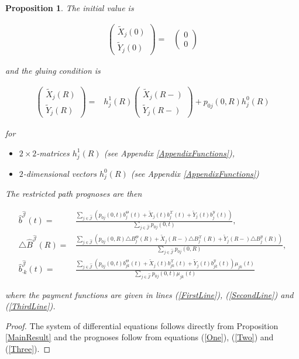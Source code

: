 \documentclass{article}
\newcommand{\1}[1]{\mathbbm{1}_{\left\lbrace #1 \right\rbrace}}
\theoremstyle{break}
\newtheorem{proposition}[definition]{Proposition}%
\theoremstyle{remark}
\numberwithin{equation}{section}
\begin{document}
\begin{proposition}
The initial value is

\begin{align*}
\begin{pmatrix}\tilde{X}_j(0) \\ \tilde{Y}_j(0)\end{pmatrix} =& \begin{pmatrix}0 \\ 0\end{pmatrix}
\end{align*}

and the gluing condition is

\begin{align*}
\begin{pmatrix}\tilde{X}_j(R) \\ \tilde{Y}_j(R)\end{pmatrix} =& h_j^1(R) \begin{pmatrix}\tilde{X}_j(R-) \\ \tilde{Y}_j(R-)\end{pmatrix} + p_{0j}(0,R) h_j^0(R)
\end{align*}

for

\begin{itemize}
	\item $2 \times 2$-matrices $h_j^1(R)$ (see Appendix \ref{AppendixFunctions}),
	\item $2$-dimensional vectors $h_j^0(R)$ (see Appendix \ref{AppendixFunctions})
\end{itemize}

The restricted path prognoses are then

\begin{align*}
	\hat{b}^{\hat{\mathcal{J}}}(t) =& \frac{\sum_{j \in \hat{\mathcal{J}}} \left( p_{0j}(0,t) b_j^\Theta(t) + \tilde{X}_j(t) b_j^\mathcal{X}(t) + \tilde{Y}_j(t) b_j^\mathcal{Y}(t)\right)}{\sum_{j \in \hat{\mathcal{J}}} p_{0j}(0,t)}, \\
	\triangle \hat{B}^{\hat{\mathcal{J}}}(R) =& \frac{\sum_{j \in \hat{\mathcal{J}}} \left(p_{0j}(0,R) \triangle B_j^\Theta(R) + \tilde{X}_j(R-) \triangle B_j^\mathcal{X}(R) + \tilde{Y}_j(R-) \triangle B_j^\mathcal{Y}(R)\right)}{\sum_{j \in \hat{\mathcal{J}}} p_{0j}(0,R)}, \\
	\hat{b}_{\cdot k}^{\hat{\mathcal{J}}}(t) =& \frac{\sum_{j \in \hat{\mathcal{J}}} \left(p_{0j}(0,t) b_{jk}^\Theta(t) + \tilde{X}_j(t) b_{jk}^\mathcal{X}(t) + \tilde{Y}_j(t) b_{jk}^\mathcal{Y}(t)\right) \mu_{jk}(t)}{\sum_{j \in \hat{\mathcal{J}}} p_{0j}(0,t) \mu_{jk}(t)}
\end{align*}

where the payment functions are given in lines (\ref{FirstLine}), (\ref{SecondLine}) and (\ref{ThirdLine}).
\end{proposition}
\begin{proof}
	The system of differential equations follows directly from Proposition \ref{MainResult} and the prognoses follow from equations (\ref{One}), (\ref{Two}) and (\ref{Three}).
\end{proof}
\end{document}

